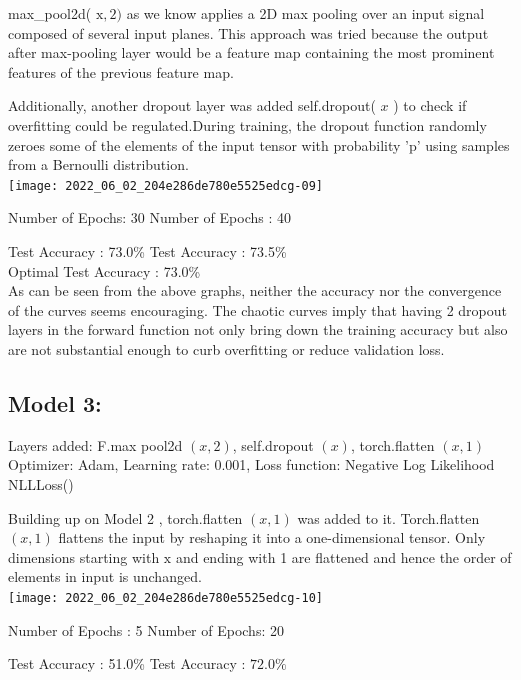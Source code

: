 \documentclass[10pt]{article}
\begin{document}
max\_pool2d( $\mathrm{x}, 2)$ as we know applies a 2D max pooling over an input signal composed of several input planes. This approach was tried because the output after max-pooling layer would be a feature map containing the most prominent features of the previous feature map.

Additionally, another dropout layer was added self.dropout( $x$ ) to check if overfitting could be regulated.During training, the dropout function randomly zeroes some of the elements of the input tensor with probability 'p' using samples from a Bernoulli distribution.\\

\texttt{[image: 2022\_06\_02\_204e286de780e5525edcg-09]}

Number of Epochs: 30 \hspace{19em} Number of Epochs : 40 

Test Accuracy : 73.0\%  \hspace{19em}  Test Accuracy : 73.5\% \\




Optimal Test Accuracy : 73.0\% \\
As can be seen from the above graphs, neither the accuracy nor the convergence of the curves seems encouraging. The chaotic curves imply that having 2 dropout layers in the forward function not only bring down the training accuracy but also are not substantial enough to curb overfitting or reduce validation loss.

\subsection{Model 3:}
Layers added: F.max pool2d $(x, 2)$, self.dropout $(x)$, torch.flatten $(x, 1)$ Optimizer: Adam, Learning rate: 0.001, Loss function: Negative Log Likelihood NLLLoss()

Building up on Model 2 , torch.flatten $(x, 1)$ was added to it. Torch.flatten $(x, 1)$ flattens the input by reshaping it into a one-dimensional tensor. Only dimensions starting with $\mathrm{x}$ and ending with 1 are flattened and hence the order of elements in input is unchanged.\\

\texttt{[image: 2022\_06\_02\_204e286de780e5525edcg-10]}

Number of Epochs : 5   \hspace{19em}  Number of Epochs: 20

Test Accuracy : 51.0\%  \hspace{19em}  Test Accuracy : $72.0 \%$\\
\end{document}
